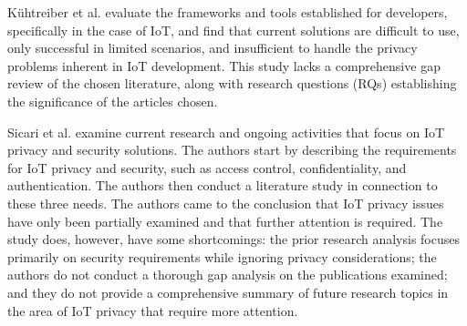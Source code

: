 Kühtreiber et al. \cite{Kuhtreiber2022survey} evaluate the frameworks and
tools established for developers, specifically in the case of IoT, and find
that current solutions are difficult to use, only successful in limited
scenarios, and insufficient to handle the privacy problems inherent in IoT
development. This study lacks a comprehensive gap review of the chosen
literature, along with research questions (RQs) establishing the significance
of the articles chosen.



Sicari et al. \cite{sicari2015security} examine current research and ongoing
activities that focus on IoT privacy and security solutions. The authors
start by describing the requirements for IoT privacy and security, such
as access control, confidentiality, and authentication. The authors then
conduct a literature study in connection to these three needs. The authors
came to the conclusion that IoT privacy issues have only been partially
examined and that further attention is required. The study does, however, have
some shortcomings: the prior research analysis focuses primarily on security
requirements while ignoring privacy considerations; the authors do not conduct
a thorough gap analysis on the publications examined; and they do not provide
a comprehensive summary of future research topics in the area of IoT privacy
that require more attention.

